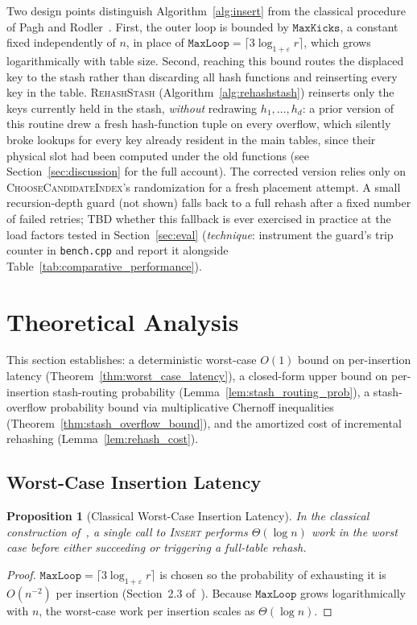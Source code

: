 \documentclass[conference]{IEEEtran}
\let\oldtextsc\textsc
\renewcommand{\textsc}[1]{\textup{\oldtextsc{#1}}}
\newtheorem{proposition}{Proposition}
\begin{document}
	Two design points distinguish Algorithm~\ref{alg:insert} from the
	classical procedure of Pagh and Rodler~\cite{pagh2004cuckoo}. First, the
	outer loop is bounded by $\mathtt{MaxKicks}$, a constant fixed
	independently of $n$, in place of
	$\mathtt{MaxLoop} = \lceil 3\log_{1+\varepsilon} r \rceil$, which grows
	logarithmically with table size. Second, reaching this bound routes the
	displaced key to the stash rather than discarding all hash functions
	and reinserting every key in the table. \textsc{RehashStash}
	(Algorithm~\ref{alg:rehashstash}) reinserts only the keys currently
	held in the stash, \emph{without} redrawing $h_1,\dots,h_d$: a prior
	version of this routine drew a fresh hash-function tuple on every
	overflow, which silently broke lookups for every key already resident
	in the main tables, since their physical slot had been computed under
	the old functions (see Section~\ref{sec:discussion} for the full
	account). The corrected version relies only on
	\textsc{ChooseCandidateIndex}'s randomization for a fresh placement
	attempt. A small recursion-depth guard (not shown) falls back to a
	full rehash after a fixed number of failed retries; TBD whether this
	fallback is ever exercised in practice at the load factors tested in
	Section~\ref{sec:eval} (\emph{technique}: instrument the guard's trip
	counter in \texttt{bench.cpp} and report it alongside Table~\ref{tab:comparative_performance}).
	
	\section{Theoretical Analysis}
	\label{sec:theory}
	
	This section establishes: a deterministic worst-case $O(1)$ bound on
	per-insertion latency (Theorem~\ref{thm:worst_case_latency}), a
	closed-form upper bound on per-insertion stash-routing probability
	(Lemma~\ref{lem:stash_routing_prob}), a stash-overflow probability
	bound via multiplicative Chernoff inequalities
	(Theorem~\ref{thm:stash_overflow_bound}), and the amortized cost of
	incremental rehashing (Lemma~\ref{lem:rehash_cost}).
	
	\subsection{Worst-Case Insertion Latency}
	
	\begin{proposition}[Classical Worst-Case Insertion Latency]
		In the classical construction of~\cite{pagh2004cuckoo}, a single call
		to \textsc{Insert} performs $\Theta(\log n)$ work in the worst case
		before either succeeding or triggering a full-table rehash.
	\end{proposition}
	\begin{proof}
		$\mathtt{MaxLoop} = \lceil 3\log_{1+\varepsilon} r \rceil$ is chosen
		so the probability of exhausting it is $O(n^{-2})$ per insertion
		(Section~2.3 of~\cite{pagh2004cuckoo}). Because $\mathtt{MaxLoop}$
		grows logarithmically with $n$, the worst-case work per insertion
		scales as $\Theta(\log n)$.
	\end{proof}
	
\end{document}
